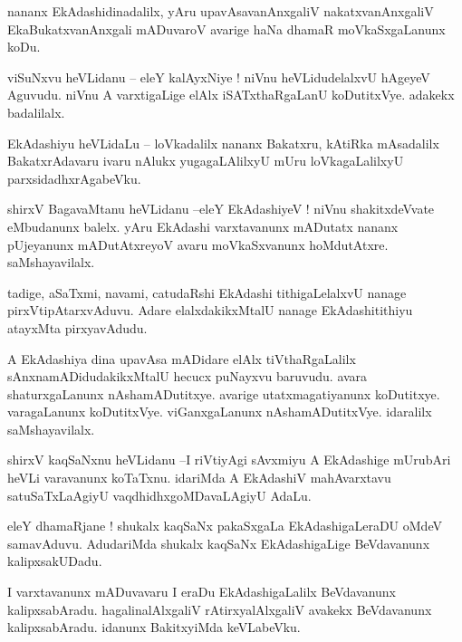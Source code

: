 \documentclass{article}
\begin{document}
\begin{mn}%
nananx EkAdashidinadalilx, yAru upavAsavanAnxgaliV nakatxvanAnxgaliV EkaBukatxvanAnxgali mADuvaroV 
avarige haNa dhamaR moVkaSxgaLanunx koDu.
\end{mn}

\begin{mn}%
viSuNxvu heVLidanu -- eleY kalAyxNiye ! niVnu heVLidudelalxvU hAgeyeV Aguvudu. niVnu A varxtigaLige 
elAlx iSATxthaRgaLanU koDutitxVye. adakekx badalilalx.
\end{mn}

\begin{mn}%
EkAdashiyu heVLidaLu -- loVkadalilx nananx Bakatxru, kAtiRka mAsadalilx BakatxrAdavaru ivaru nAlukx 
yugagaLAlilxyU mUru loVkagaLalilxyU parxsidadhxrAgabeVku.
\end{mn}

\begin{mn}%
shirxV BagavaMtanu heVLidanu --eleY EkAdashiyeV ! niVnu shakitxdeVvate eMbudanunx balelx. yAru 
EkAdashi varxtavanunx mADutatx nananx pUjeyanunx mADutAtxreyoV avaru moVkaSxvanunx hoMdutAtxre. 
saMshayavilalx.
\end{mn}

\begin{mn}%
tadige, aSaTxmi, navami, catudaRshi EkAdashi tithigaLelalxvU nanage pirxVtipAtarxvAduvu. Adare 
elalxdakikxMtalU nanage EkAdashitithiyu atayxMta pirxyavAdudu.
\end{mn}

\begin{mn}%
A EkAdashiya dina upavAsa mADidare elAlx tiVthaRgaLalilx sAnxnamADidudakikxMtalU hecucx puNayxvu 
baruvudu. avara shaturxgaLanunx nAshamADutitxye. avarige utatxmagatiyanunx koDutitxye. 
varagaLanunx koDutitxVye. viGanxgaLanunx nAshamADutitxVye. idaralilx saMshayavilalx.
\end{mn}

\begin{mn}%
shirxV kaqSaNxnu heVLidanu --I riVtiyAgi sAvxmiyu A EkAdashige mUrubAri heVLi varavanunx koTaTxnu. 
idariMda A EkAdashiV mahAvarxtavu satuSaTxLaAgiyU vaqdhidhxgoMDavaLAgiyU AdaLu.
\end{mn}

\begin{mn}%
eleY dhamaRjane ! shukalx kaqSaNx pakaSxgaLa EkAdashigaLeraDU oMdeV samavAduvu. AdudariMda shukalx 
kaqSaNx EkAdashigaLige BeVdavanunx kalipxsakUDadu.
\end{mn}

\begin{mn}%
I varxtavanunx mADuvavaru I eraDu EkAdashigaLalilx BeVdavanunx kalipxsabAradu. hagalinalAlxgaliV 
rAtirxyalAlxgaliV avakekx BeVdavanunx kalipxsabAradu. idanunx BakitxyiMda keVLabeVku.
\end{mn}
\end{document}
